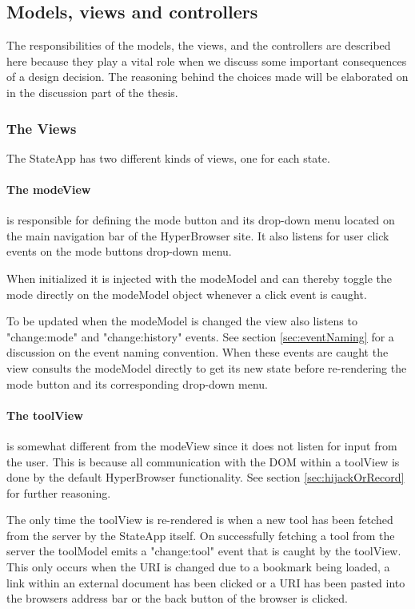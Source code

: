 \documentclass[english]{ifimaster}
\begin{document}
\subsection{Models, views and controllers} 
The responsibilities of the models, the views, and the controllers are described here because they play a vital role when we discuss some important consequences of a design decision. The reasoning behind the choices made will be elaborated on in the discussion part of the thesis.
\subsubsection{The Views}
The StateApp has two different kinds of views, one for each state. 

\paragraph{The modeView} is responsible for defining the mode button and its drop-down menu located on the main navigation bar of the HyperBrowser site. It also listens for user click events on the mode buttons drop-down menu. 

When initialized it is injected with the modeModel and can thereby toggle the mode directly on the modeModel object whenever a click event is caught.

To be updated when the modeModel is changed the view also listens to "change:mode" and "change:history" events. See section \ref{sec:eventNaming} for a discussion on the event naming convention. When these events are caught the view consults the modeModel directly to get its new state before re-rendering the mode button and its corresponding drop-down menu.   

\paragraph{The toolView} is somewhat different from the modeView since it does not listen for input from the user. This is because all communication with the DOM within a toolView is done by the default HyperBrowser functionality. See section \ref{sec:hijackOrRecord} for further reasoning.

The only time the toolView is re-rendered is when a new tool has been fetched from the server by the StateApp itself. On successfully fetching a tool from the server the toolModel emits a "change:tool" event that is caught by the toolView. This only occurs when the URI is changed due to a bookmark being loaded, a link within an external document has been clicked or a URI has been pasted into the browsers address bar or the back button of the browser is clicked. 
\end{document}
